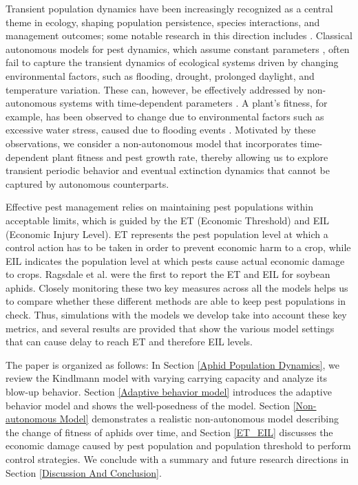 \documentclass[sn-mathphys-num]{sn-jnl}
\numberwithin{equation}{section}
\numberwithin{equation}{section}
\begin{document}
Transient population dynamics have been increasingly recognized as a central theme in ecology, shaping population persistence, species interactions, and management outcomes; some notable research in this direction includes \cite{t1,t2,t3,t4}.
Classical autonomous models for pest dynamics, which assume constant parameters \cite{toab218}, often fail to capture the transient dynamics of ecological systems driven by changing environmental factors, such as flooding, drought, prolonged daylight, and temperature variation. These can, however, be effectively addressed by non-autonomous systems with time-dependent parameters \cite{coutinhoa2006threshold,hallam1981non,baranyi1993non}. A plant's fitness, for example, has been observed to change due to environmental factors such as excessive water stress, caused due to flooding events \cite{lewis2025host}. Motivated by these observations, we consider a non-autonomous model that incorporates time-dependent plant fitness and pest growth rate, thereby allowing us to explore transient periodic behavior and eventual extinction dynamics that cannot be captured by autonomous counterparts. 


\par Effective pest management relies on maintaining pest populations within acceptable limits, which is guided by the ET (Economic Threshold) and EIL (Economic Injury Level).  ET represents the pest population level at
which a control action has to be taken in order to prevent economic
harm to a crop, while EIL indicates the population level at which pests cause actual economic damage to crops. Ragsdale et al. \cite{ragsdale2007economic} were the first to report the ET and EIL for soybean aphids.  Closely monitoring these two key measures across all the models helps us to compare whether these different methods are able to keep pest populations in check. Thus, simulations with the models we develop take into account these key metrics, and several results are provided that show the various model settings that can cause delay to reach ET and therefore EIL levels.


The paper is organized as follows: In Section \ref{Aphid Population Dynamics}, we review the Kindlmann model with varying carrying capacity and analyze its blow-up behavior. Section \ref{Adaptive behavior model} introduces the adaptive behavior model and shows the well-posedness of the model. Section \ref{Non-autonomous Model} demonstrates a realistic non-autonomous model describing the change of fitness of aphids over time, and Section \ref{ET_EIL} discusses the economic damage caused by pest population and population threshold to perform control strategies. We conclude with a summary and future research directions in Section \ref{Discussion And Conclusion}.
\end{document}
